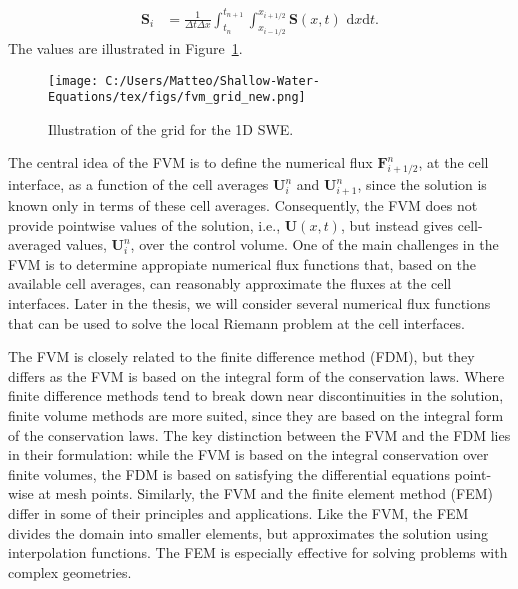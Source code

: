 \begin{align*}
    \mathbf{S}_i &= \frac{1}{\Delta t \Delta x} \int_{t_n}^{t_{n+1}} \int_{x_{i-1/2}}^{x_{i+1/2}} \mathbf{S}(x,t) \text{ d}x\text{d}t.
\end{align*}
The values are illustrated in Figure~\ref{fig:10_3}.
\begin{figure}[H]
    \centering
    \texttt{[image: C:/Users/Matteo/Shallow-Water-Equations/tex/figs/fvm\_grid\_new.png]}
    \caption{Illustration of the grid for the 1D SWE.}\label{fig:10_3}
\end{figure}
The central idea of the FVM is to define the numerical flux $\mathbf{F}_{i+1/2}^n$, at the cell interface, as a function of the cell averages $\mathbf{U}_i^n$ and $\mathbf{U}_{i+1}^n$, since the solution is known only in terms of these cell averages.
Consequently, the FVM does not provide pointwise values of the solution, i.e., $\mathbf{U}(x,t)$, but instead gives cell-averaged values, $\mathbf{U}_i^n$, over the control volume.
One of the main challenges in the FVM is to determine appropiate numerical flux functions that, based on the available cell averages, can reasonably approximate the fluxes at the cell interfaces. 
Later in the thesis, we will consider several numerical flux functions that can be used to solve the local Riemann problem at the cell interfaces.

The FVM is closely related to the finite difference method (FDM), but they differs as the FVM is based on the integral form of the conservation laws.
Where finite difference methods tend to break down near discontinuities in the solution, finite volume methods are more suited, since they are based on the integral form of the conservation laws.
The key distinction between the FVM and the FDM lies in their formulation: while the FVM is based on the integral conservation over finite volumes, the FDM is based on satisfying the differential equations point-wise at mesh points.
Similarly, the FVM and the finite element method (FEM) differ in some of their principles and applications.
Like the FVM, the FEM divides the domain into smaller elements, but approximates the solution using interpolation functions.
The FEM is especially effective for solving problems with complex geometries.


